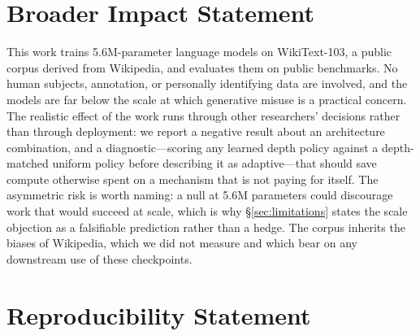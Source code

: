 \documentclass{article}
\begin{document}








\section*{Broader Impact Statement}

This work trains 5.6M-parameter language models on WikiText-103, a public corpus
derived from Wikipedia, and evaluates them on public benchmarks. No human
subjects, annotation, or personally identifying data are involved, and the models
are far below the scale at which generative misuse is a practical concern. The
realistic effect of the work runs through other researchers' decisions rather
than through deployment: we report a negative result about an architecture
combination, and a diagnostic---scoring any learned depth policy against a
depth-matched uniform policy before describing it as adaptive---that should save
compute otherwise spent on a mechanism that is not paying for itself. The
asymmetric risk is worth naming: a null at 5.6M parameters could discourage work
that would succeed at scale, which is why \S\ref{sec:limitations} states the
scale objection as a falsifiable prediction rather than a hedge. The corpus
inherits the biases of Wikipedia, which we did not measure and which bear on any
downstream use of these checkpoints.

\section*{Reproducibility Statement}
\end{document}
